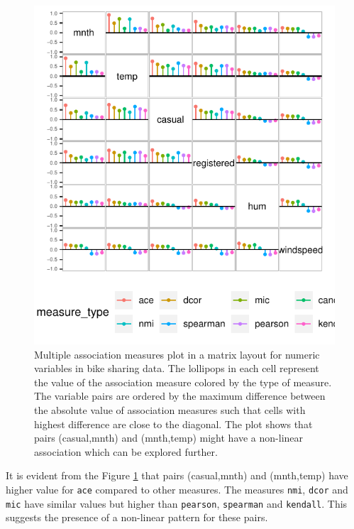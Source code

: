 \begin{figure}

{\centering \includegraphics{rjpaperCHMar22_files/figure-latex/compare-matrix-1} 

}

\caption{Multiple association measures plot in a matrix layout for numeric variables in bike sharing data. The lollipops in each cell represent the value of the association measure colored by the type of measure. The variable pairs are ordered by the maximum difference between the absolute value of association measures such that cells with highest difference are close to the diagonal. The plot shows that pairs (casual,mnth) and (mnth,temp) might have a non-linear association which can be explored further.}\label{fig:compare-matrix}
\end{figure}

It is evident from the Figure \ref{fig:compare-matrix} that pairs (casual,mnth) and (mnth,temp) have higher value for \texttt{ace} compared to other measures. The measures \texttt{nmi}, \texttt{dcor} and \texttt{mic} have similar values but higher than \texttt{pearson}, \texttt{spearman} and \texttt{kendall}. This suggests the presence of a non-linear pattern for these pairs.

